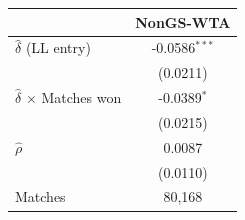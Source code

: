\begin{tabular}{lc}
\toprule
 & NonGS-WTA \\
\midrule
$\hat{\delta}$ (LL entry) & -0.0586$^{***}$ \\
 & (0.0211) \\
$\hat{\delta}$ $\times$ Matches won & -0.0389$^{*}$ \\
 & (0.0215) \\
$\hat{\rho}$ & 0.0087 \\
 & (0.0110) \\
\midrule
Matches & 80,168 \\
\bottomrule
\end{tabular}
